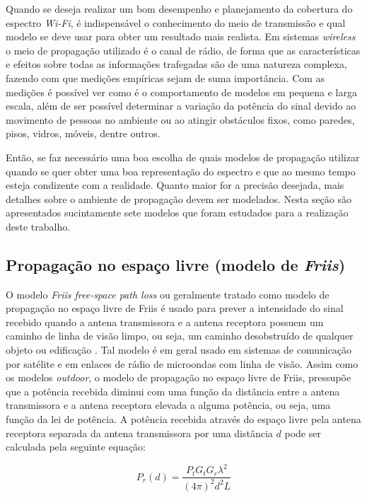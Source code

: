 \documentclass[
	12pt,				%
	twoside,			%
	a4paper,			%
	english,			%
	french,				%
	spanish,			%
	brazil				%
	]{abntex2}
\begin{document}
Quando se deseja realizar um bom desempenho e planejamento da cobertura
do espectro \emph{Wi-Fi}, é indispensável o conhecimento do meio de
transmissão e qual modelo se deve usar para obter um resultado mais
realista. Em sistemas \emph{wireless} o meio de propagação utilizado é o
canal de rádio, de forma que as características e efeitos sobre todas as
informações trafegadas são de uma natureza complexa, fazendo com que
medições empíricas sejam de suma importância. Com as medições é possível
ver como é o comportamento de modelos em pequena e larga escala, além de
ser possível determinar a variação da potência do sinal devido ao
movimento de pessoas no ambiente ou ao atingir obstáculos fixos, como
paredes, pisos, vidros, móveis, dentre outros.

Então, se faz necessário uma boa escolha de quais modelos de propagação
utilizar quando se quer obter uma boa representação do espectro e que ao
mesmo tempo esteja condizente com a realidade. Quanto maior for a
precisão desejada, mais detalhes sobre o ambiente de propagação devem
ser modelados. Nesta seção são apresentados sucintamente sete modelos
que foram estudados para a realização deste trabalho.

\subsection{\texorpdfstring{Propagação no espaço livre (modelo de
\emph{Friis})}{Propagação no espaço livre (modelo de Friis)}}\label{sec:friis}

O modelo \emph{Friis free-space path loss} ou geralmente tratado como
modelo de propagação no espaço livre de Friis é usado para prever a
intensidade do sinal recebido quando a antena transmissora e a antena
receptora possuem um caminho de linha de visão limpo, ou seja, um
caminho desobstruído de qualquer objeto ou edificação \cite{LUO}. Tal
modelo é em geral usado em sistemas de comunicação por satélite e em
enlaces de rádio de microondas com linha de visão. Assim como os modelos
\emph{outdoor}, o modelo de propagação no espaço livre de Friis,
pressupõe que a potência recebida diminui com uma função da distância
entre a antena transmissora e a antena receptora elevada a alguma
potência, ou seja, uma função da lei de potência. A potência recebida
através do espaço livre pela antena receptora separada da antena
transmissora por uma distância \(d\) pode ser calculada pela seguinte
equação:

\begin{equation}
P_{r}(d)= \frac{P_{t}G_{t}G_{r}\lambda^{2}}{(4\pi)^{2}d^{2}L}
\end{equation}
\end{document}
